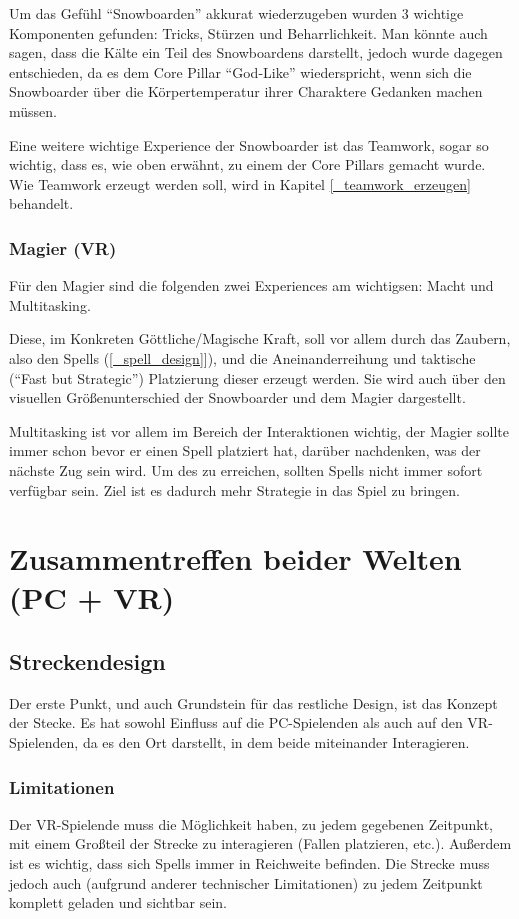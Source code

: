 Um das Gefühl "`Snowboarden"' akkurat wiederzugeben wurden 3 wichtige Komponenten gefunden: Tricks, Stürzen und Beharrlichkeit. Man könnte auch sagen, dass die Kälte ein Teil des Snowboardens darstellt, jedoch wurde dagegen entschieden, da es dem Core Pillar "`God-Like"' wiederspricht, wenn sich die Snowboarder über die Körpertemperatur ihrer Charaktere Gedanken machen müssen.

Eine weitere wichtige Experience der Snowboarder ist das Teamwork, sogar so wichtig, dass es, wie oben erwähnt, zu einem der Core Pillars gemacht wurde. Wie Teamwork erzeugt werden soll, wird in Kapitel \ref{_teamwork_erzeugen} behandelt.

\subsubsection{Magier (VR)}
Für den Magier sind die folgenden zwei Experiences am wichtigsen: Macht und Multitasking. 

Diese, im Konkreten Göttliche/Magische Kraft, soll vor allem durch das Zaubern, also den Spells (\ref{_spell_design}]), und die Aneinanderreihung und taktische ("`Fast but Strategic"') Platzierung dieser erzeugt werden. Sie wird auch über den visuellen Größenunterschied der Snowboarder und dem Magier dargestellt.

Multitasking ist vor allem im Bereich der Interaktionen wichtig, der Magier sollte immer schon bevor er einen Spell platziert hat, darüber nachdenken, was der nächste Zug sein wird. Um des zu erreichen, sollten Spells nicht immer sofort verfügbar sein. Ziel ist es dadurch mehr Strategie in das Spiel zu bringen.

\section{Zusammentreffen beider Welten (PC + VR)}

\subsection{Streckendesign}
Der erste Punkt, und auch Grundstein für das restliche Design, ist das Konzept der Stecke. Es hat sowohl Einfluss auf die PC-Spielenden als auch auf den VR-Spielenden, da es den Ort darstellt, in dem beide miteinander Interagieren.

\subsubsection{Limitationen}
Der VR-Spielende muss die Möglichkeit haben, zu jedem gegebenen Zeitpunkt, mit einem Großteil der Strecke zu interagieren (Fallen platzieren, etc.). Außerdem ist es wichtig, dass sich Spells immer in Reichweite befinden. Die Strecke muss jedoch auch (aufgrund anderer technischer Limitationen) zu jedem Zeitpunkt komplett geladen und sichtbar sein.

